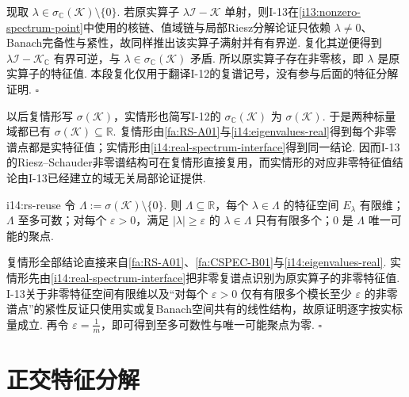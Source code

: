 \begin{FAProof}
现取 \(\displaystyle \lambda\in\sigma_{\mathbb C}(\mathcal K)\setminus\{0\}\). 若原实算子 \(\displaystyle \lambda\mathcal I-\mathcal K\) 单射，则I-13在\autoref{i13:nonzero-spectrum-point}中使用的核链、值域链与局部Riesz分解论证只依赖 \(\displaystyle \lambda\neq0\)、Banach完备性与紧性，故同样推出该实算子满射并有有界逆. 复化其逆便得到 \(\displaystyle \lambda\mathcal I-\mathcal K_{\mathbb C}\) 有界可逆，与 \(\displaystyle \lambda\in\sigma_{\mathbb C}(\mathcal K)\) 矛盾. 所以原实算子存在非零核，即 \(\displaystyle \lambda\) 是原实算子的特征值. 本段复化仅用于翻译I-12的复谱记号，没有参与后面的特征分解证明.
\hfill\(\square\)
\end{FAProof}

以后复情形写 \(\displaystyle \sigma(\mathcal K)\)，实情形也简写I-12的 \(\displaystyle \sigma_{\mathbb C}(\mathcal K)\) 为 \(\displaystyle \sigma(\mathcal K)\). 于是两种标量域都已有 \(\displaystyle \sigma(\mathcal K)\subseteq\mathbb R\).
复情形由\autoref{fa:RS-A01}与\autoref{i14:eigenvalues-real}得到每个非零谱点都是实特征值；实情形由\autoref{i14:real-spectrum-interface}得到同一结论. 因而I-13的Riesz--Schauder非零谱结构可在复情形直接复用，而实情形的对应非零特征值结论由I-13已经建立的域无关局部论证提供.

\begin{FAProposition}[C][非零谱结构的本章复用]{i14:rs-reuse}
令 \(\displaystyle \Lambda:=\sigma(\mathcal K)\setminus\{0\}\).
则 \(\displaystyle \Lambda\subseteq\mathbb R\)，每个 \(\displaystyle \lambda\in\Lambda\) 的特征空间 \(\displaystyle E_\lambda\) 有限维；\(\displaystyle \Lambda\) 至多可数；对每个 \(\displaystyle \varepsilon>0\)，满足 \(\displaystyle |\lambda|\geqslant\varepsilon\) 的 \(\displaystyle \lambda\in\Lambda\) 只有有限多个；\(\displaystyle0\) 是 \(\displaystyle \Lambda\) 唯一可能的聚点.
\end{FAProposition}

\begin{FAProof}
复情形全部结论直接来自\autoref{fa:RS-A01}、\autoref{fa:CSPEC-B01}与\autoref{i14:eigenvalues-real}. 实情形先由\autoref{i14:real-spectrum-interface}把非零复谱点识别为原实算子的非零特征值. I-13关于非零特征空间有限维以及“对每个 \(\displaystyle \varepsilon>0\) 仅有有限多个模长至少 \(\displaystyle \varepsilon\) 的非零谱点”的紧性反证只使用实或复Banach空间共有的线性结构，故原证明逐字按实标量成立. 再令 \(\displaystyle \varepsilon=\frac{1}{m}\)，即可得到至多可数性与唯一可能聚点为零.
\hfill\(\square\)
\end{FAProof}

\section{正交特征分解}\label{sec:i14-orthogonal-decomposition}

